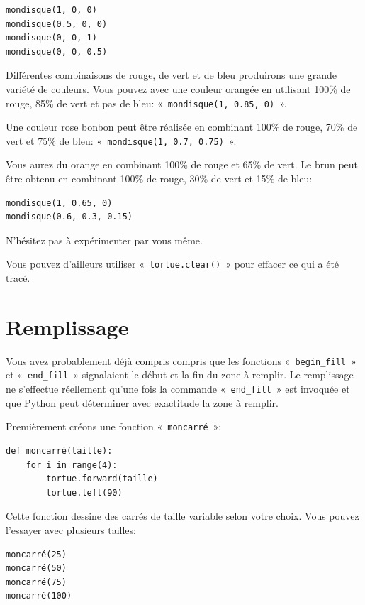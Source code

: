\begin{Verbatim}[frame=single,rulecolor=\color{mbleu}, label=à taper]
mondisque(1, 0, 0)
mondisque(0.5, 0, 0)
mondisque(0, 0, 1)
mondisque(0, 0, 0.5)
\end{Verbatim}

Différentes combinaisons de rouge, de vert et de bleu produirons une grande variété de couleurs.
Vous pouvez avec une couleur orangée en utilisant 100\% de rouge, 85\% de vert et pas de bleu: «~\texttt{mondisque(1, 0.85, 0)}~».

Une couleur rose bonbon peut être réalisée en combinant 100\% de rouge, 70\% de vert et 75\% de bleu: «~\texttt{mondisque(1, 0.7, 0.75)}~». 

Vous aurez du orange en combinant 100\% de rouge et 65\% de vert. Le brun peut être obtenu en combinant 100\% de rouge, 30\% de vert et 15\% de bleu:
\begin{Verbatim}[frame=single,rulecolor=\color{mbleu}, label=à taper]
mondisque(1, 0.65, 0)
mondisque(0.6, 0.3, 0.15)
\end{Verbatim}

N'hésitez pas à expérimenter par vous même. 

Vous pouvez d'ailleurs utiliser «~\texttt{tortue.clear()}~» pour effacer ce qui a été tracé.


\section{Remplissage}
Vous avez probablement déjà compris compris que les fonctions «~\texttt{begin\_fill}~» et «~\texttt{end\_fill}~» signalaient le début et la fin du zone à remplir. Le remplissage ne s'effectue réellement qu'une fois la commande «~\texttt{end\_fill}~» est invoquée et que Python peut déterminer avec exactitude la zone à remplir.

Premièrement créons une fonction «~\texttt{moncarré}~»:
\begin{Verbatim}[frame=single,rulecolor=\color{mbleu}, label=à taper]
def moncarré(taille):
    for i in range(4):
        tortue.forward(taille)
        tortue.left(90)
\end{Verbatim}

Cette fonction dessine des carrés de taille variable selon votre choix.
Vous pouvez l'essayer avec plusieurs tailles:
\begin{Verbatim}[frame=single,rulecolor=\color{mbleu}, label=à taper]
moncarré(25)
moncarré(50)
moncarré(75)
moncarré(100)
\end{Verbatim}

